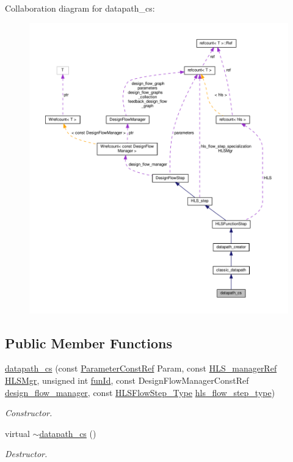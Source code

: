 Collaboration diagram for datapath\+\_\+cs\+:
\nopagebreak
\begin{figure}[H]
\begin{center}
\leavevmode
\includegraphics[width=350pt]{da/dba/classdatapath__cs__coll__graph}
\end{center}
\end{figure}
\subsection*{Public Member Functions}
\begin{DoxyCompactItemize}
\item 
\hyperlink{classdatapath__cs_abd6ce04b1cbaec19dc48f4aef2a0e0ba}{datapath\+\_\+cs} (const \hyperlink{Parameter_8hpp_a37841774a6fcb479b597fdf8955eb4ea}{Parameter\+Const\+Ref} Param, const \hyperlink{hls__manager_8hpp_acd3842b8589fe52c08fc0b2fcc813bfe}{H\+L\+S\+\_\+manager\+Ref} \hyperlink{classHLS__step_ade85003a99d34134418451ddc46a18e9}{H\+L\+S\+Mgr}, unsigned int \hyperlink{classHLSFunctionStep_a3e6434fd86c698b0c70520b859bff5b0}{fun\+Id}, const Design\+Flow\+Manager\+Const\+Ref \hyperlink{classDesignFlowStep_ab770677ddf087613add30024e16a5554}{design\+\_\+flow\+\_\+manager}, const \hyperlink{hls__step_8hpp_ada16bc22905016180e26fc7e39537f8d}{H\+L\+S\+Flow\+Step\+\_\+\+Type} \hyperlink{classHLS__step_aefd59af15346ec3f10bf12bd756e6777}{hls\+\_\+flow\+\_\+step\+\_\+type})
\begin{DoxyCompactList}\small\item\em Constructor. \end{DoxyCompactList}\item 
virtual \hyperlink{classdatapath__cs_a8af0fe08d8def340585616268426cb54}{$\sim$datapath\+\_\+cs} ()
\begin{DoxyCompactList}\small\item\em Destructor. \end{DoxyCompactList}\end{DoxyCompactItemize}
